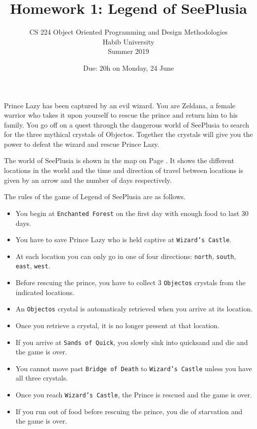 \documentclass[addpoints]{exam}
\title{Homework 1: Legend of SeePlusia}
\author{CS 224 Object Oriented Programming and Design Methodologies\\Habib University\\Summer 2019}
\date{Due: 20h on Monday, 24 June}
\begin{document}
\maketitle

\begin{questions}


Prince Lazy has been captured by an evil wizard. You are Zeldana, a female warrior who takes it upon yourself to rescue the prince and return him to his family. You go off on a quest through the dangerous world of SeePlusia to search for the three mythical crystals of Objectos. Together the crystals will give you the power to defeat the wizard and rescue Prince Lazy.

The world of SeePlusia is shown in the map on Page \pageref{sec:map}. It shows the different locations in the world and the time and direction of travel between locations is given by an arrow and the number of days respectively.

The rules of the game of Legend of SeePlusia are as follows.
\begin{itemize}
\item You begin at {\tt Enchanted Forest} on the first day with enough food to last 30 days.
\item You have to save Prince Lazy who is held captive at {\tt Wizard's Castle}.
\item At each location you can only go in one of four directions: {\tt north}, {\tt south}, {\tt east}, {\tt west}.
\item Before rescuing the prince, you have to collect 3 {\tt Objectos} crystals from the indicated locations.
\item An {\tt Objectos} crystal is automaticaly retrieved when you arrive at its location.
\item Once you retrieve a crystal, it is no longer present at that location.
\item If you arrive at {\tt Sands of Quick}, you slowly sink into quicksand and die and the game is over.
\item You cannot move past {\tt Bridge of Death} to {\tt Wizard's Castle} unless you have all three crystals.
\item Once you reach {\tt Wizard's Castle}, the Prince is rescued and the game is over.
\item If you run out of food before rescuing the prince, you die of starvation and the game is over.
\end{itemize}


\end{questions}
\end{document}
